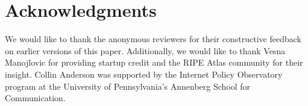 \section*{Acknowledgments}

We would like to thank the anonymous reviewers for their constructive
feedback on earlier versions of this paper. Additionally, we would like
to thank Vesna Manojlovic for providing startup credit and the RIPE
Atlas community for their insight. Collin Anderson was supported by the
Internet Policy Observatory program at the University of Pennsylvania's
Annenberg School for Communication.